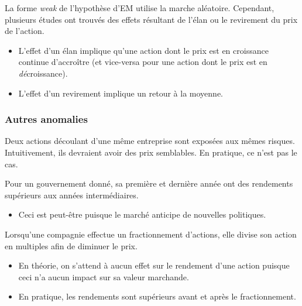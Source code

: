 \documentclass[10pt, french]{article}
\begin{document}
\begin{multicols*}{2}
\begin{definitionNOHFILLprop}
La forme \og \textit{weak} \fg{} de l'hypothèse d'EM utilise la marche aléatoire. Cependant, plusieurs études ont trouvés des effets résultant de l'élan ou le revirement du prix de l'action.
\begin{itemize}
	\item	L'effet d'un élan implique qu'une action dont le prix est en croissance continue d'accroître (et vice-versa pour une action dont le prix est en \textit{dé}croissance). 
	\item	L'effet d'un revirement implique un retour à la moyenne.
\end{itemize}
\end{definitionNOHFILLprop}

\subsubsection{Autres anomalies}
\begin{definitionNOHFILLprop}
Deux actions découlant d'une même entreprise sont exposées aux mêmes risques. Intuitivement, ils devraient avoir des prix semblables. En pratique, ce n'est pas le cas.
\end{definitionNOHFILLprop}

\begin{definitionNOHFILLprop}
Pour un gouvernement donné, sa première et dernière année ont des rendements supérieurs aux années intermédiaires.

\begin{itemize}
	\item	Ceci est peut-être puisque le marché anticipe de nouvelles politiques.
\end{itemize}
\end{definitionNOHFILLprop}

\begin{definitionNOHFILLprop}
Lorsqu'une compagnie effectue un fractionnement d'actions, elle divise son action en multiples afin de diminuer le prix.
\begin{itemize}
	\item	En théorie, on s'attend à aucun effet sur le rendement d'une action puisque ceci n'a aucun impact sur sa valeur marchande.
	\item	En pratique, les rendements sont supérieurs avant et après le fractionnement.
\end{itemize}
\end{definitionNOHFILLprop}


\end{multicols*}
\end{document}
